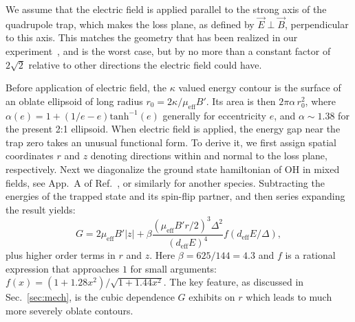 \documentclass[defaultstyle,11pt]{thesis}
\begin{document}
We assume that the electric field is applied parallel to the strong axis of the quadrupole trap, which makes the loss plane, as defined by $\vec{E}\perp\vec{B}$, perpendicular to this axis. This matches the geometry that has been realized in our experiment~\cite{Stuhl2013}, and is the worst case, but by no more than a constant factor of $2\sqrt{2}$ relative to other directions the electric field could have.

Before application of electric field, the $\kappa$ valued energy contour is the surface of an oblate ellipsoid of long radius $r_0=2\kappa/\mu_\text{eff}B'$.
Its area is then $2\pi\alpha\,r_0^2$, where $\alpha(e)=1+(1/e-e)\text{tanh}^{-1}(e)$ generally for eccentricity $e$, and $\alpha\sim 1.38$ for the present 2:1 ellipsoid.
When electric field is applied, the energy gap near the trap zero takes an unusual functional form.
To derive it, we first assign spatial coordinates $r$ and $z$ denoting directions within and normal to the loss plane, respectively.
Next we diagonalize the ground state hamiltonian of OH in mixed fields, see App.~A of Ref.~\cite{Stuhl2012uwave}, or similarly for another species.
Subtracting the energies of the trapped state and its spin-flip partner, and then series expanding the result yields:
\begin{equation}
\label{eqn:energy}
G = 2\mu_\text{eff}B'|z| + \beta\frac{(\mu_\text{eff}B'r/2)^3\Delta^2}{(d_\text{eff}E)^4}f(d_\text{eff}E/\Delta),
\end{equation}
plus higher order terms in $r$ and $z$.
Here $\beta=625/144=4.3$ and $f$ is a rational expression that approaches $1$ for small arguments: $f(x) = (1 + 1.28x^2)/\sqrt{1+1.44x^2}$.
The key feature, as discussed in Sec.~\ref{sec:mech}, is the cubic dependence $G$ exhibits on $r$ which leads to much more severely oblate contours.
\end{document}
